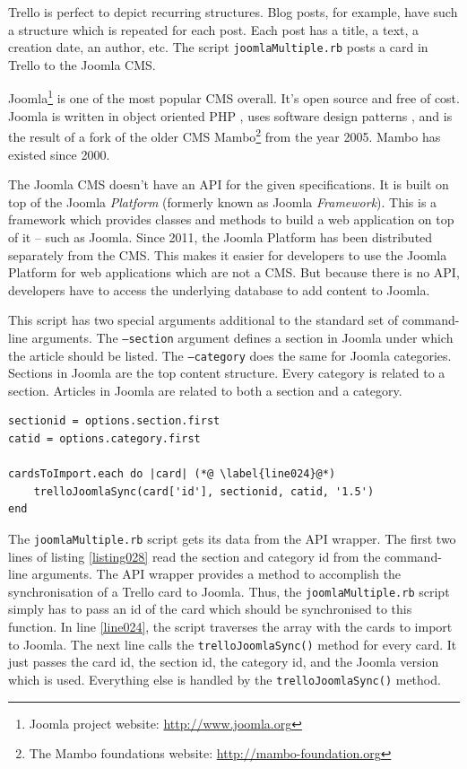 Trello is perfect to depict recurring structures. Blog posts, for example, have such a structure which is repeated for each post. Each post has a title, a text, a creation date, an author, etc. The script \texttt{joomlaMultiple.rb} posts a card in Trello to the Joomla CMS.

Joomla\footnote{Joomla project website: \url{http://www.joomla.org}} is one of the most popular CMS  overall. It's open source and free of cost. Joomla is written in object oriented PHP \cite{joomla:architecture}, uses software design patterns \cite{joomla:mvc}, and is the result of a fork of the older CMS Mambo\footnote{The Mambo foundations website: \url{http://mambo-foundation.org}} from the year 2005. Mambo has existed since 2000.

The Joomla CMS doesn't have an API for the given specifications. It is built on top of the Joomla \emph{Platform} (formerly known as Joomla \emph{Framework}). This is a framework which provides classes and methods to build a web application on top of it – such as Joomla. Since 2011, the Joomla Platform has been distributed separately from the CMS. This makes it easier for developers to use the Joomla Platform for web applications which are not a CMS. \cite{joomla:api} But because there is no API, developers have to access the underlying database to add content to Joomla.

This script has two special arguments additional to the standard set of command-line arguments. The \texttt{--section} argument defines a section in Joomla under which the article should be listed. The \texttt{--category} does the same for Joomla categories. Sections in Joomla are the top content structure. Every category is related to a section. Articles in Joomla are related to both a section and a category.

\begin{lstlisting}[aboveskip=1\baselineskip, caption=Passing the needed information to the trelloJoomlaSync() method., label=listing028]
sectionid = options.section.first
catid = options.category.first

cardsToImport.each do |card| (*@ \label{line024}@*)
	trelloJoomlaSync(card['id'], sectionid, catid, '1.5')
end
\end{lstlisting}

The \texttt{joomlaMultiple.rb} script gets its data from the API wrapper. The first two lines of listing \ref{listing028} read the section and category id from the command-line arguments. The API wrapper provides a method to accomplish the synchronisation of a Trello card to Joomla. Thus, the \texttt{joomlaMultiple.rb} script simply has to pass an id of the card which should be synchronised to this function. In line \ref{line024}, the script traverses the array with the cards to import to Joomla. The next line calls the \lstinline{trelloJoomlaSync()} method for every card. It just passes the card id, the section id, the category id, and the Joomla version which is used. Everything else is handled by the \lstinline{trelloJoomlaSync()} method.

